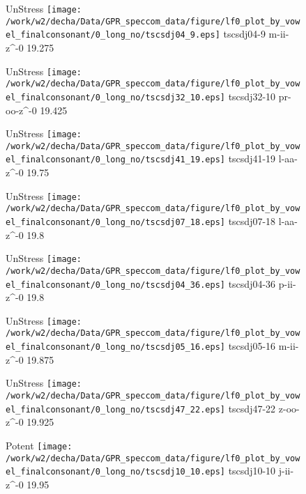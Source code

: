 \documentclass{article}
\begin{document}
\begin{figure}[t]
\begin{minipage}[b]{.24\textwidth}
UnStress
\centering
\texttt{[image: /work/w2/decha/Data/GPR\_speccom\_data/figure/lf0\_plot\_by\_vowel\_finalconsonant/0\_long\_no/tscsdj04\_9.eps]}
tscsdj04-9 m-ii-z\textasciicircum-0 19.275
\end{minipage}
\begin{minipage}[b]{.24\textwidth}
UnStress
\centering
\texttt{[image: /work/w2/decha/Data/GPR\_speccom\_data/figure/lf0\_plot\_by\_vowel\_finalconsonant/0\_long\_no/tscsdj32\_10.eps]}
tscsdj32-10 pr-oo-z\textasciicircum-0 19.425
\end{minipage}
\begin{minipage}[b]{.24\textwidth}
UnStress
\centering
\texttt{[image: /work/w2/decha/Data/GPR\_speccom\_data/figure/lf0\_plot\_by\_vowel\_finalconsonant/0\_long\_no/tscsdj41\_19.eps]}
tscsdj41-19 l-aa-z\textasciicircum-0 19.75
\end{minipage}
\begin{minipage}[b]{.24\textwidth}
UnStress
\centering
\texttt{[image: /work/w2/decha/Data/GPR\_speccom\_data/figure/lf0\_plot\_by\_vowel\_finalconsonant/0\_long\_no/tscsdj07\_18.eps]}
tscsdj07-18 l-aa-z\textasciicircum-0 19.8
\end{minipage}
\end{figure}

\begin{figure}[t]
\begin{minipage}[b]{.24\textwidth}
UnStress
\centering
\texttt{[image: /work/w2/decha/Data/GPR\_speccom\_data/figure/lf0\_plot\_by\_vowel\_finalconsonant/0\_long\_no/tscsdj04\_36.eps]}
tscsdj04-36 p-ii-z\textasciicircum-0 19.8
\end{minipage}
\begin{minipage}[b]{.24\textwidth}
UnStress
\centering
\texttt{[image: /work/w2/decha/Data/GPR\_speccom\_data/figure/lf0\_plot\_by\_vowel\_finalconsonant/0\_long\_no/tscsdj05\_16.eps]}
tscsdj05-16 m-ii-z\textasciicircum-0 19.875
\end{minipage}
\begin{minipage}[b]{.24\textwidth}
UnStress
\centering
\texttt{[image: /work/w2/decha/Data/GPR\_speccom\_data/figure/lf0\_plot\_by\_vowel\_finalconsonant/0\_long\_no/tscsdj47\_22.eps]}
tscsdj47-22 z-oo-z\textasciicircum-0 19.925
\end{minipage}
\begin{minipage}[b]{.24\textwidth}
\colorbox{Apricot}{Potent}
\centering
\texttt{[image: /work/w2/decha/Data/GPR\_speccom\_data/figure/lf0\_plot\_by\_vowel\_finalconsonant/0\_long\_no/tscsdj10\_10.eps]}
tscsdj10-10 j-ii-z\textasciicircum-0 19.95
\end{minipage}
\end{figure}
\end{document}
